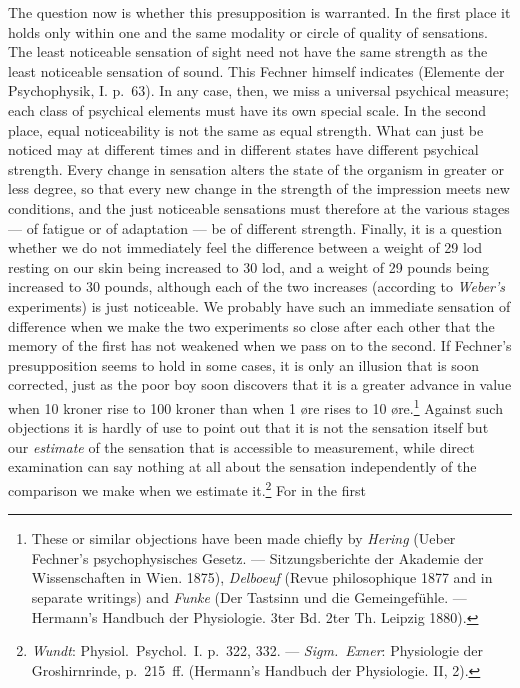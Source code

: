 \documentclass[12pt,a4paper]{book}
\newcommand{\opage}[1]{\marginnote{\footnotesize\textit{[#1]}}}
\begin{document}
The question now is whether this presupposition is warranted. In the
first place it holds only within one and the same modality or circle of
quality of sensations. The least noticeable sensation of sight need not
have the same strength as the least noticeable sensation of sound. This
Fechner himself indicates (Elemente der Psychophysik, I. p.~63). In any
case, then, we miss a universal psychical measure; each class of
psychical elements must have its own special scale. In the second place,
equal noticeability is not the same as equal strength. What can just be
noticed may at different times and in different states have different
psychical strength. Every change in sensation alters the state of the
organism in greater or less degree, so that every new change in the
strength of the impression meets new conditions, and the just noticeable
sensations must therefore at the various stages --- of fatigue or of
adaptation --- be of different strength.
\opage{27}Finally, it is a question whether we do not immediately feel
the difference between a weight of 29 lod resting on our skin being
increased to 30 lod, and a weight of 29 pounds being increased to 30
pounds, although each of the two increases (according to
\emph{Weber's} experiments) is just noticeable. We probably have such an
immediate sensation of difference when we make the two experiments so
close after each other that the memory of the first has not weakened when
we pass on to the second. If Fechner's presupposition seems to hold in
some cases, it is only an illusion that is soon corrected, just as the
poor boy soon discovers that it is a greater advance in value when 10
kroner rise to 100 kroner than when 1 øre rises to 10
øre.\footnote{These or similar objections have been made chiefly by
\emph{Hering} (Ueber Fechner's psychophysisches Gesetz. ---
Sitzungsberichte der Akademie der Wissenschaften in Wien. 1875),
\emph{Delboeuf} (Revue philosophique 1877 and in separate writings) and
\emph{Funke} (Der Tastsinn und die Gemeingefühle. --- Hermann's Handbuch
der Physiologie. 3ter Bd. 2ter Th. Leipzig 1880).} Against such
objections it is hardly of use to point out that it is not the sensation
itself but our \emph{estimate} of the sensation that is accessible to
measurement, while direct examination can say nothing at all about the
sensation independently of the comparison we make
when we estimate it.\footnote{\emph{Wundt}: Physiol.\ Psychol.\ I.
p.~322, 332. --- \emph{Sigm.\ Exner}: Physiologie der Groshirnrinde,
p.~215~ff. (Hermann's Handbuch der Physiologie. II, 2).} For in the first
\end{document}
